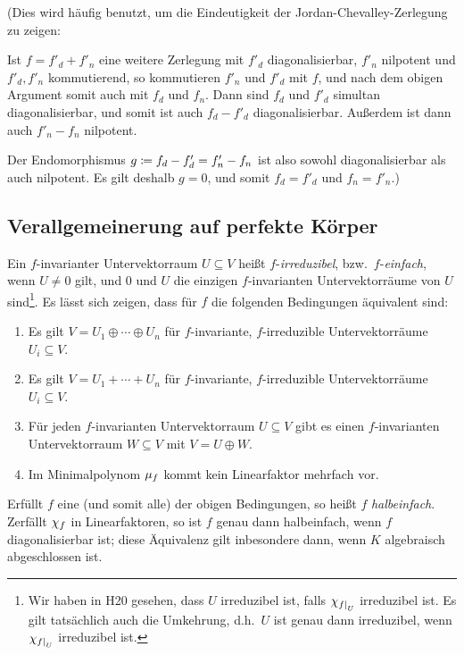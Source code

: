 (Dies wird häufig benutzt, um die Eindeutigkeit der Jordan-Chevalley-Zerlegung zu zeigen:

Ist $f = f'_d + f'_n$ eine weitere Zerlegung mit $f'_d$ diagonalisierbar, $f'_n$ nilpotent und $f'_d, f'_n$ kommutierend, so kommutieren $f'_n$ und $f'_d$ mit $f$, und nach dem obigen Argument somit auch mit $f_d$ und $f_n$.
Dann sind $f_d$ und $f'_d$ simultan diagonalisierbar, und somit ist auch $f_d - f'_d$ diagonalisierbar.
Außerdem ist dann auch $f'_n - f_n$ nilpotent.

Der Endomorphismus $g \coloneqq f_d - f'_d = f'_n - f_n$ ist also sowohl diagonalisierbar als auch nilpotent.
Es gilt deshalb $g = 0$, und somit $f_d = f'_d$ und $f_n = f'_n$.)





\subsection*{Verallgemeinerung auf perfekte Körper}

Ein $f$-invarianter Untervektorraum $U \subseteq V$ heißt $f$-\emph{irreduzibel}, bzw.\ $f$-\emph{einfach}, wenn $U \neq 0$ gilt, und $0$ und $U$ die einzigen $f$-invarianten Untervektorräume von $U$ sind\footnote{
Wir haben in H20 gesehen, dass $U$ irreduzibel ist, falls $\charpol{\restrict{f}{U}}$ irreduzibel ist.
Es gilt tatsächlich auch die Umkehrung, d.h.\ $U$ ist genau dann irreduzibel, wenn $\charpol{\restrict{f}{U}}$ irreduzibel ist.}.
Es lässt sich zeigen, dass für $f$ die folgenden Bedingungen äquivalent sind:

\begin{enumerate}
  \item
    Es gilt $V = U_1 \oplus \dotsb \oplus U_n$ für $f$-invariante, $f$-irreduzible Untervektorräume $U_i \subseteq V$.
  \item
    Es gilt $V = U_1 + \dotsb + U_n$ für $f$-invariante, $f$-irreduzible Untervektorräume $U_i \subseteq V$.
  \item
    Für jeden $f$-invarianten Untervektorraum $U \subseteq V$ gibt es einen $f$-invarianten Untervektorraum $W \subseteq V$ mit $V = U \oplus W$.
  \item
    Im Minimalpolynom $\mu_{f}$ kommt kein Linearfaktor mehrfach vor.
\end{enumerate}

Erfüllt $f$ eine (und somit alle) der obigen Bedingungen, so heißt $f$ \emph{halbeinfach}.
Zerfällt $\chi_{f}$ in Linearfaktoren, so ist $f$ genau dann halbeinfach, wenn $f$ diagonalisierbar ist;
diese Äquivalenz gilt inbesondere dann, wenn $K$ algebraisch abgeschlossen ist.

